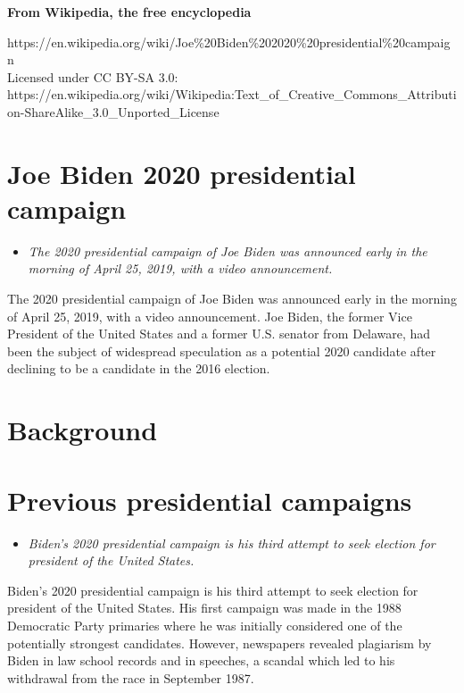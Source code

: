 \textbf{From Wikipedia, the free encyclopedia}

https://en.wikipedia.org/wiki/Joe\%20Biden\%202020\%20presidential\%20campaign\\
Licensed under CC BY-SA 3.0:\\
https://en.wikipedia.org/wiki/Wikipedia:Text\_of\_Creative\_Commons\_Attribution-ShareAlike\_3.0\_Unported\_License

\section{Joe Biden 2020 presidential
campaign}\label{joe-biden-2020-presidential-campaign}

\begin{itemize}
\item
  \emph{The 2020 presidential campaign of Joe Biden was announced early
  in the morning of April 25, 2019, with a video announcement.}
\end{itemize}

The 2020 presidential campaign of Joe Biden was announced early in the
morning of April 25, 2019, with a video announcement. Joe Biden, the
former Vice President of the United States and a former U.S. senator
from Delaware, had been the subject of widespread speculation as a
potential 2020 candidate after declining to be a candidate in the 2016
election.

\section{Background}\label{background}

\section{Previous presidential
campaigns}\label{previous-presidential-campaigns}

\begin{itemize}
\item
  \emph{Biden's 2020 presidential campaign is his third attempt to seek
  election for president of the United States.}
\end{itemize}

Biden's 2020 presidential campaign is his third attempt to seek election
for president of the United States. His first campaign was made in the
1988 Democratic Party primaries where he was initially considered one of
the potentially strongest candidates. However, newspapers revealed
plagiarism by Biden in law school records and in speeches, a scandal
which led to his withdrawal from the race in September 1987.


